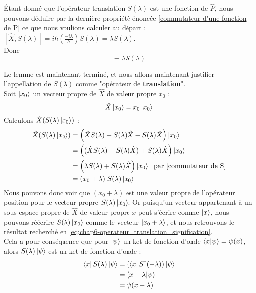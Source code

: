 \documentclass[../notesdecours]{subfiles}
\begin{document}
\'Etant donné que l'opérateur translation $S(\lambda)$ est une fonction de $\hat{P}$, nous pouvons déduire par la dernière propriété énoncée \eqref{commutateur d'une fonction de P} ce que nous voulions calculer au départ : 
$[\hat{X}, S(\lambda)] = i\hbar \left( \frac{-i \lambda}{\hbar} \right) S(\lambda) = \lambda S(\lambda)$. \\
Donc \begin{equation}
    [\hat{X}, S(\lambda)] =\lambda S(\lambda)
    \label{commutateur de S}
\end{equation}

Le lemme est maintenant terminé, et nous allons maintenant justifier l'appellation de $S(\lambda)$ comme "opérateur de \textbf{translation}". \\

Soit $\ket{x_0}$ un vecteur propre de $\hat{X}$ de valeur propre $x_0$ : $$ \hat{X} \ket{x_0} = x_0 \ket{x_0} $$
Calculons $\hat{X} (S(\lambda) \ket{x_0})$ : 
\begin{align}
    \hat{X} (S(\lambda) \ket{x_0}) &= \left( \hat{X}S(\lambda) + S(\lambda) \hat{X} - S(\lambda)\hat{X} \right) \ket{x_0} \notag \\
    &= \left( (\hat{X}S(\lambda) - S(\lambda)\hat{X}) + S(\lambda)\hat{X} \right) \ket{x_0} \notag \\
    &= \left( \lambda S(\lambda) + S(\lambda) \hat{X} \right) \ket{x_0} \; \mbox{ par \eqref{commutateur de S}} \notag \\
    &= (x_0 + \lambda) \; S(\lambda) \ket{x_0}
\end{align}
Nous pouvons donc voir que $(x_0 + \lambda)$ est une valeur propre de l'opérateur position pour le vecteur propre $S(\lambda) \ket{x_0}$. Or puisqu'un vecteur appartenant à un sous-espace propre de $\hat{X}$ de valeur propre $x$ peut s'écrire comme $\ket{x}$, nous pouvons réécrire $S(\lambda) \ket{x_0}$ comme le vecteur $\ket{x_0 + \lambda}$, et nous retrouvons le résultat recherché en \eqref{eq:chap6-operateur_translation_signification}. \\

Cela a pour conséquence que pour $\ket{\psi}$ un ket de fonction d'onde $\braket{x|\psi} = \psi(x)$, alors $S(\lambda) \ket{\psi}$ est un ket de fonction d'onde : 
\begin{align}
    \bra{x}S(\lambda) \ket{\psi} &= (\bra{x}S^\dagger (-\lambda)) \ket{\psi} \notag \\
    &= \braket{x-\lambda | \psi} \notag \\
    &= \psi(x-\lambda) 
\end{align}
\end{document}
